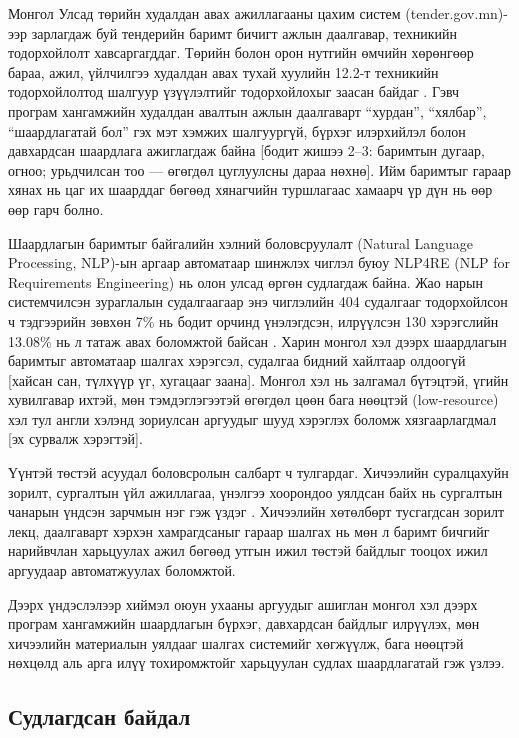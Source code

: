 Монгол Улсад төрийн худалдан авах ажиллагааны цахим систем (tender.gov.mn)-ээр зарлагдаж буй тендерийн баримт бичигт ажлын даалгавар, техникийн тодорхойлолт хавсаргагддаг. Төрийн болон орон нутгийн өмчийн хөрөнгөөр бараа, ажил, үйлчилгээ худалдан авах тухай хуулийн 12.2-т техникийн тодорхойлолтод шалгуур үзүүлэлтийг тодорхойлохыг заасан байдаг \cite{huuli2023}. Гэвч програм хангамжийн худалдан авалтын ажлын даалгаварт \enquote{хурдан}, \enquote{хялбар}, \enquote{шаардлагатай бол} гэх мэт хэмжих шалгуургүй, бүрхэг илэрхийлэл болон давхардсан шаардлага ажиглагдаж байна [бодит жишээ 2--3: баримтын дугаар, огноо; урьдчилсан тоо — өгөгдөл цуглуулсны дараа нөхнө]. Ийм баримтыг гараар хянах нь цаг их шаарддаг бөгөөд хянагчийн туршлагаас хамаарч үр дүн нь өөр өөр гарч болно.

Шаардлагын баримтыг байгалийн хэлний боловсруулалт (Natural Language Processing, NLP)-ын аргаар автоматаар шинжлэх чиглэл буюу NLP4RE (NLP for Requirements Engineering) нь олон улсад өргөн судлагдаж байна. Жао нарын системчилсэн зураглалын судалгаагаар энэ чиглэлийн 404 судалгааг тодорхойлсон ч тэдгээрийн зөвхөн 7\% нь бодит орчинд үнэлэгдсэн, илрүүлсэн 130 хэрэгслийн 13.08\% нь л татаж авах боломжтой байсан \cite{zhao2021}. Харин монгол хэл дээрх шаардлагын баримтыг автоматаар шалгах хэрэгсэл, судалгаа бидний хайлтаар олдоогүй [хайсан сан, түлхүүр үг, хугацааг заана]. Монгол хэл нь залгамал бүтэцтэй, үгийн хувилгавар ихтэй, мөн тэмдэглэгээтэй өгөгдөл цөөн бага нөөцтэй (low-resource) хэл тул англи хэлэнд зориулсан аргуудыг шууд хэрэглэх боломж хязгаарлагдмал [эх сурвалж хэрэгтэй].

Үүнтэй төстэй асуудал боловсролын салбарт ч тулгардаг. Хичээлийн суралцахуйн зорилт, сургалтын үйл ажиллагаа, үнэлгээ хоорондоо уялдсан байх нь сургалтын чанарын үндсэн зарчмын нэг гэж үздэг \cite{biggs1996}. Хичээлийн хөтөлбөрт тусгагдсан зорилт лекц, даалгаварт хэрхэн хамрагдсаныг гараар шалгах нь мөн л баримт бичгийг нарийвчлан харьцуулах ажил бөгөөд утгын ижил төстэй байдлыг тооцох ижил аргуудаар автоматжуулах боломжтой.

Дээрх үндэслэлээр хиймэл оюун ухааны аргуудыг ашиглан монгол хэл дээрх програм хангамжийн шаардлагын бүрхэг, давхардсан байдлыг илрүүлэх, мөн хичээлийн материалын уялдааг шалгах системийг хөгжүүлж, бага нөөцтэй нөхцөлд аль арга илүү тохиромжтойг харьцуулан судлах шаардлагатай гэж үзлээ.

\subsection*{Судлагдсан байдал}
